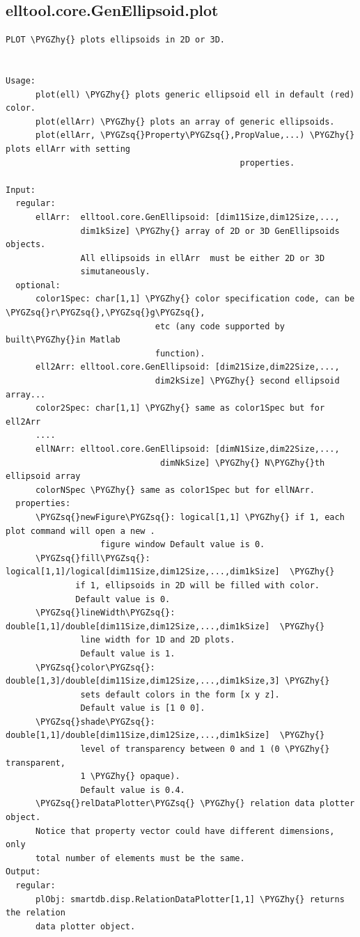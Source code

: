 \documentclass[letterpaper,10pt,english]{sphinxmanual}
\def\PYGZhy{\char`\-}
\def\PYGZsq{\char`\'}
\begin{document}
\subsection{elltool.core.GenEllipsoid.plot}
\label{chap_functions:elltool-core-genellipsoid-plot}
\begin{Verbatim}[commandchars=\\\{\}]
PLOT \PYGZhy{} plots ellipsoids in 2D or 3D.


Usage:
      plot(ell) \PYGZhy{} plots generic ellipsoid ell in default (red) color.
      plot(ellArr) \PYGZhy{} plots an array of generic ellipsoids.
      plot(ellArr, \PYGZsq{}Property\PYGZsq{},PropValue,...) \PYGZhy{} plots ellArr with setting
                                               properties.

Input:
  regular:
      ellArr:  elltool.core.GenEllipsoid: [dim11Size,dim12Size,...,
               dim1kSize] \PYGZhy{} array of 2D or 3D GenEllipsoids objects.
               All ellipsoids in ellArr  must be either 2D or 3D
               simutaneously.
  optional:
      color1Spec: char[1,1] \PYGZhy{} color specification code, can be \PYGZsq{}r\PYGZsq{},\PYGZsq{}g\PYGZsq{},
                              etc (any code supported by built\PYGZhy{}in Matlab
                              function).
      ell2Arr: elltool.core.GenEllipsoid: [dim21Size,dim22Size,...,
                              dim2kSize] \PYGZhy{} second ellipsoid array...
      color2Spec: char[1,1] \PYGZhy{} same as color1Spec but for ell2Arr
      ....
      ellNArr: elltool.core.GenEllipsoid: [dimN1Size,dim22Size,...,
                               dimNkSize] \PYGZhy{} N\PYGZhy{}th ellipsoid array
      colorNSpec \PYGZhy{} same as color1Spec but for ellNArr.
  properties:
      \PYGZsq{}newFigure\PYGZsq{}: logical[1,1] \PYGZhy{} if 1, each plot command will open a new .
                   figure window Default value is 0.
      \PYGZsq{}fill\PYGZsq{}: logical[1,1]/logical[dim11Size,dim12Size,...,dim1kSize]  \PYGZhy{}
              if 1, ellipsoids in 2D will be filled with color.
              Default value is 0.
      \PYGZsq{}lineWidth\PYGZsq{}: double[1,1]/double[dim11Size,dim12Size,...,dim1kSize]  \PYGZhy{}
               line width for 1D and 2D plots.
               Default value is 1.
      \PYGZsq{}color\PYGZsq{}: double[1,3]/double[dim11Size,dim12Size,...,dim1kSize,3] \PYGZhy{}
               sets default colors in the form [x y z].
               Default value is [1 0 0].
      \PYGZsq{}shade\PYGZsq{}: double[1,1]/double[dim11Size,dim12Size,...,dim1kSize]  \PYGZhy{}
               level of transparency between 0 and 1 (0 \PYGZhy{} transparent,
               1 \PYGZhy{} opaque).
               Default value is 0.4.
      \PYGZsq{}relDataPlotter\PYGZsq{} \PYGZhy{} relation data plotter object.
      Notice that property vector could have different dimensions, only
      total number of elements must be the same.
Output:
  regular:
      plObj: smartdb.disp.RelationDataPlotter[1,1] \PYGZhy{} returns the relation
      data plotter object.


\end{Verbatim}
\end{document}

